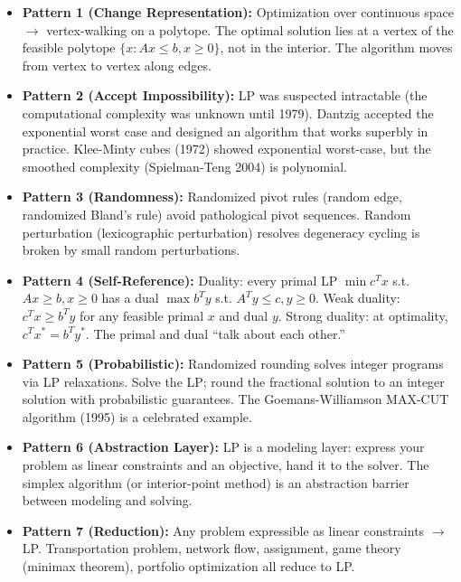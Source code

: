 \begin{itemize}
\item \textbf{Pattern 1 (Change Representation):} Optimization over continuous space $\to$ vertex-walking on a polytope. The optimal solution lies at a vertex of the feasible polytope $\{x : Ax \le b, x \ge 0\}$, not in the interior. The algorithm moves from vertex to vertex along edges.

\item \textbf{Pattern 2 (Accept Impossibility):} LP was suspected intractable (the computational complexity was unknown until 1979). Dantzig accepted the exponential worst case and designed an algorithm that works superbly in practice. Klee-Minty cubes (1972) showed exponential worst-case, but the smoothed complexity (Spielman-Teng 2004) is polynomial.

\item \textbf{Pattern 3 (Randomness):} Randomized pivot rules (random edge, randomized Bland's rule) avoid pathological pivot sequences. Random perturbation (lexicographic perturbation) resolves degeneracy cycling is broken by small random perturbations.

\item \textbf{Pattern 4 (Self-Reference):} Duality: every primal LP $\min c^T x$ s.t. $Ax \ge b, x \ge 0$ has a dual $\max b^T y$ s.t. $A^T y \le c, y \ge 0$. Weak duality: $c^T x \ge b^T y$ for any feasible primal $x$ and dual $y$. Strong duality: at optimality, $c^T x^* = b^T y^*$. The primal and dual ``talk about each other.''

\item \textbf{Pattern 5 (Probabilistic):} Randomized rounding solves integer programs via LP relaxations. Solve the LP; round the fractional solution to an integer solution with probabilistic guarantees. The Goemans-Williamson MAX-CUT algorithm (1995) is a celebrated example.

\item \textbf{Pattern 6 (Abstraction Layer):} LP is a modeling layer: express your problem as linear constraints and an objective, hand it to the solver. The simplex algorithm (or interior-point method) is an abstraction barrier between modeling and solving.

\item \textbf{Pattern 7 (Reduction):} Any problem expressible as linear constraints $\to$ LP. Transportation problem, network flow, assignment, game theory (minimax theorem), portfolio optimization all reduce to LP.


\end{itemize}

